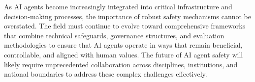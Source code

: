 \documentclass[conference]{IEEEtran}
\begin{document}
As AI agents become increasingly integrated into critical infrastructure and decision-making processes, the importance of robust safety mechanisms cannot be overstated. The field must continue to evolve toward comprehensive frameworks that combine technical safeguards, governance structures, and evaluation methodologies to ensure that AI agents operate in ways that remain beneficial, controllable, and aligned with human values. The future of AI agent safety will likely require unprecedented collaboration across disciplines, institutions, and national boundaries to address these complex challenges effectively.



\end{document}
